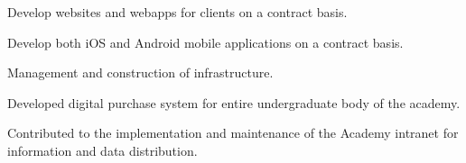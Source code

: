 \documentclass[letterpaper]{deedy-resume} %
\begin{document}
\begin{minipage}[t]{0.60\textwidth}
\vspace{\topsep} %
\begin{tightitemize}
\item Develop websites and webapps for clients on a contract basis.
\item Develop both iOS and Android mobile applications on a contract basis.
\item Management and construction of infrastructure.
\end{tightitemize}

\sectionspace %
\sectionspace %

%
%



\vspace{\topsep} %
\begin{tightitemize}
\item Developed digital purchase system for entire undergraduate body of the academy.
\item Contributed to the implementation and maintenance of the Academy intranet for information and data distribution.
\end{tightitemize}

\sectionspace %



\end{minipage}
\end{document}
